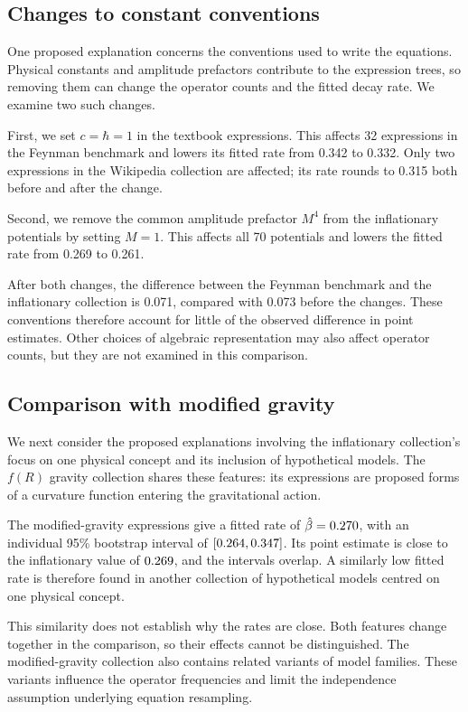 \documentclass[10pt]{article}
\begin{document}
\subsection{Changes to constant conventions}\label{sec:units}
One proposed explanation concerns the conventions used to write the equations. Physical constants and amplitude prefactors contribute to the expression trees, so removing them can change the operator counts and the fitted decay rate. We examine two such changes.

First, we set $c=\hbar=1$ in the textbook expressions. This affects 32 expressions in the Feynman benchmark and lowers its fitted rate from 0.342 to 0.332. Only two expressions in the Wikipedia collection are affected; its rate rounds to 0.315 both before and after the change.

Second, we remove the common amplitude prefactor $M^4$ from the inflationary potentials by setting $M=1$. This affects all 70 potentials and lowers the fitted rate from 0.269 to 0.261.

After both changes, the difference between the Feynman benchmark and the inflationary collection is 0.071, compared with 0.073 before the changes. These conventions therefore account for little of the observed difference in point estimates. Other choices of algebraic representation may also affect operator counts, but they are not examined in this comparison.

\subsection{Comparison with modified gravity}\label{sec:fr}
We next consider the proposed explanations involving the inflationary collection's focus on one physical concept and its inclusion of hypothetical models. The $f(R)$ gravity collection shares these features: its expressions are proposed forms of a curvature function entering the gravitational action.

The \nfR{} modified-gravity expressions give a fitted rate of $\hat\beta=0.270$, with an individual 95\% bootstrap interval of $[0.264,0.347]$. Its point estimate is close to the inflationary value of $0.269$, and the intervals overlap. A similarly low fitted rate is therefore found in another collection of hypothetical models centred on one physical concept.

This similarity does not establish why the rates are close. Both features change together in the comparison, so their effects cannot be distinguished. The modified-gravity collection also contains related variants of model families. These variants influence the operator frequencies and limit the independence assumption underlying equation resampling.
\end{document}
